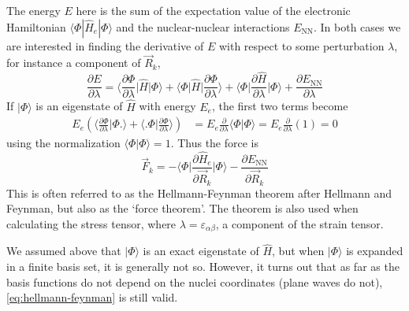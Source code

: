 \documentclass[11pt,bibliography=totoc,index=totoc]{scrbook}   %
\begin{document}
The energy $E$ here is the sum of the expectation value of the electronic Hamiltonian $\langle\Phi|\hat{H}_e|\Phi\rangle$ and the nuclear-nuclear interactions $E_{\text{NN}}$.
In both cases we are interested in finding the derivative of $E$ with respect to some perturbation $\lambda$, for instance a component of $\vec{R}_k$,
\begin{equation}
    \frac{\partial E}{\partial\lambda} 
  = \biggl\langle \frac{\partial\Phi}{\partial\lambda} \biggl| \hat{H} \biggr| \Phi \biggr\rangle
  + \biggl\langle \Phi \biggl| \hat{H} \biggr| \frac{\partial\Phi}{\partial\lambda} \biggr\rangle
  + \biggl\langle \Phi \biggl| \frac{\partial\hat{H}}{\partial\lambda} \biggr| \Phi \biggr\rangle
  + \frac{\partial E_{\text{NN}}}{\partial\lambda}
\end{equation}
If $|\Phi\rangle$ is an eigenstate of $\hat{H}$ with energy $E_e$, the first two terms become
\begin{align}
  E_e \left (\biggl\langle \frac{\partial\Phi}{\partial\lambda} \biggl| \Phi \biggr. \biggr\rangle
  + \biggl\langle\biggl. \Phi \biggr| \frac{\partial\Phi}{\partial\lambda} \biggr\rangle \right) 
  &= E_e \frac{\partial}{\partial\lambda} \langle \Phi | \Phi \rangle 
  = E_e \frac{\partial}{\partial\lambda} (1) = 0
\end{align}
using the normalization $\langle\Phi|\Phi\rangle=1$. Thus the force is
\begin{equation}
    \vec{F}_k = - \biggl\langle \Phi \biggl| \frac{\partial\hat{H}_e}{\partial\vec{R}_k} \biggr| \Phi \biggr\rangle - \frac{\partial E_{\text{NN}}}{\partial\vec{R}_k}
  \label{eq:hellmann-feynman}
\end{equation}
This is often referred to as the Hellmann-Feynman theorem after Hellmann\cite{Hellmann:1937} 
and Feynman\cite{Feynman:1939}, but also as the `force theorem'.\cite[56]{Martin:2004} 
The theorem is also used when calculating the stress tensor, where $\lambda=\varepsilon_{\alpha\beta}$, a component of the strain tensor.

We assumed above that $|\Phi\rangle$ is an exact eigenstate of $\hat{H}$, but when $|\Phi\rangle$ is expanded in a finite basis set, it is generally not so.
However, it turns out that as far as the basis functions do not depend on the nuclei coordinates (plane waves do not), \eqref{eq:hellmann-feynman} is still valid.\cite[see e.g.][p. 557]{Kantorovich:2004}

\end{document}

